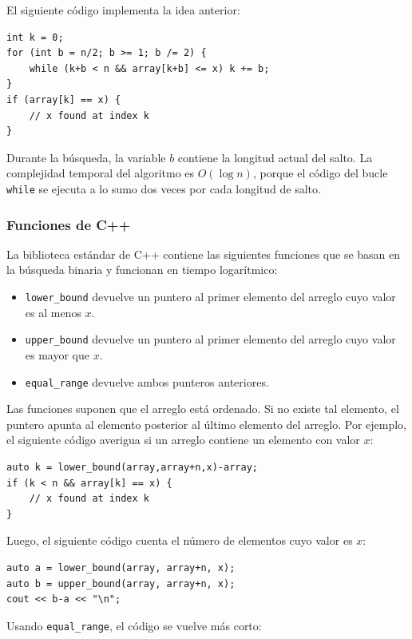 El siguiente código implementa la idea anterior:
\begin{lstlisting}
int k = 0;
for (int b = n/2; b >= 1; b /= 2) {
    while (k+b < n && array[k+b] <= x) k += b;
}
if (array[k] == x) {
    // x found at index k
}
\end{lstlisting}

Durante la búsqueda, la variable $b$
contiene la longitud actual del salto.
La complejidad temporal del algoritmo es $O(\log n)$,
porque el código del bucle \texttt{while}
se ejecuta a lo sumo dos veces por cada longitud de salto.

\subsubsection{Funciones de C++}

La biblioteca estándar de C++ contiene las siguientes funciones
que se basan en la búsqueda binaria y funcionan en tiempo logarítmico:

\begin{itemize}
\item \texttt{lower\_bound} devuelve un puntero al
primer elemento del arreglo cuyo valor es al menos $x$.
\item \texttt{upper\_bound} devuelve un puntero al
primer elemento del arreglo cuyo valor es mayor que $x$.
\item \texttt{equal\_range} devuelve ambos punteros anteriores.
\end{itemize}

Las funciones suponen que el arreglo está ordenado.
Si no existe tal elemento, el puntero apunta
al elemento posterior al último elemento del arreglo.
Por ejemplo, el siguiente código averigua si
un arreglo contiene un elemento con valor $x$:

\begin{lstlisting}
auto k = lower_bound(array,array+n,x)-array;
if (k < n && array[k] == x) {
    // x found at index k
}
\end{lstlisting}

Luego, el siguiente código cuenta el número de elementos
cuyo valor es $x$:

\begin{lstlisting}
auto a = lower_bound(array, array+n, x);
auto b = upper_bound(array, array+n, x);
cout << b-a << "\n";
\end{lstlisting}

Usando \texttt{equal\_range}, el código se vuelve más corto:

